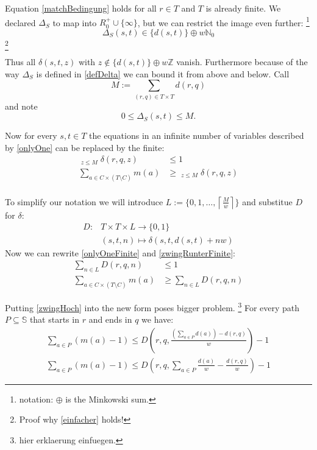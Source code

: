 \documentclass[a4paper]{amsart} %
\newcommand{\todo}[1]{\footnote{#1}}
\begin{document}
Equation \ref{matchBedingung} holds for all \(r \in T\) and \(T\) is
already finite.  We declared \(\Delta_S\) to map into \(R^+_0 \cup
\{\infty\}\), but we can restrict the image even further:
\todo{notation: \(\oplus\) is the Minkowski sum.}
\begin{equation}
\label{einfacher}
\Delta_S (s,t) \in \{d (s,t)\} \oplus w \mathbb{N}_0
\end{equation}
\todo{Proof why \ref{einfacher} holds!}

Thus all \(\delta (s, t, z)\) with \(z \notin \{d (s,t)\} \oplus w
\mathbb{Z}\) vanish.  Furthermore because of the way \(\Delta_S\) is
defined in \ref{defDelta} we can bound it from above and below. Call
\[M := \sum_{(r,q) \in T \times T} d (r,q)\]
and note
\[0 \leq \Delta_S(s,t) \leq M \textrm{.}\]


Now for every \(s,t \in T\) the equations in an infinite number of
variables described by \ref{onlyOne} can be replaced by the finite:
\begin{align}
  \label{onlyOneFinite}
  \mathop{\sum_{z \in \left\{d (s,t)\right\} \oplus w \mathbb{N}_0}}_{z\leq M} \delta(r, q, z) & \leq 1 \\
  \label{zwingRunterFinite}
  \sum_{a \in C \times (T \setminus C)} m(a) & \geq \mathop{\sum_{z \in \left\{d (s,t)\right\} \oplus w \mathbb{N}_0}}_{z\leq M} \delta (r,q, z) \\
\end{align}

To simplify our notation we will introduce \(L := \{0, 1, \dots,
\left\lceil \frac{M}{w} \right\rceil \}\) and substitue \(D\) for
\(\delta\):
\begin{align}
  D \colon & T \times T \times L  \to \{0,1\} \\
          & (s,       t,        n)                              \mapsto \delta (s,t, d(s,t) + n w)
\end{align}
Now we can rewrite \ref{onlyOneFinite} and \ref{zwingRunterFinite}:
\begin{align}
  \label{onlyOneFiniteN}
  \sum_{n \in L} D (r, q, n) & \leq 1 \\
  \label{zwingRunterFiniteN}
  \sum_{a \in C \times (T \setminus C)} m(a) & \geq \sum_{n \in L} D (r,q, n)
\end{align}

Putting \ref{zwingHoch} into the new form poses bigger
problem. \todo{hier erklaerung einfuegen.}  For every path \(P
\subseteq \mathbb{S}\) that starts in \(r\) and ends in \(q\) we have:
\begin{align}
\sum_{a \in P} (m(a) - 1) \leq D \left(r,q, \frac{\left(\sum_{a \in P} d \left(a\right)\right) -d(r,q)}{w}\right) - 1  \\
\label{zwingHochFiniteN}
\sum_{a \in P} (m(a) - 1) \leq D \left(r,q, \sum_{a \in P} \frac{ d \left(a\right)}{w} - \frac{d(r,q)}{w}\right) - 1
\end{align}
\end{document}
